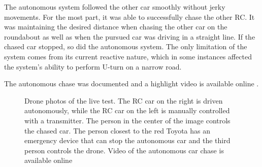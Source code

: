 \documentclass{ctuthesis/ctuthesis}
\begin{document}
The autonomous system followed the other car smoothly without jerky movements. For the most part, it was able to successfully chase the other RC. It was maintaining the desired distance when chasing the other car on the roundabout as well as when the pursued car was driving in a straight line. If the chased car stopped, so did the autonomous system. The only limitation of the system comes from its current reactive nature, which in some instances affected the system's ability to perform U-turn on a narrow road. \par

The autonomous chase was documented and a highlight video is available online \cite{my_yt_video}.

\begin{figure}[]
    \centering
    \quad
    \caption{Drone photos of the live test. The RC car on the right is driven autonomously, while the RC car on the left is manually controlled with a transmitter. The person in the center of the image controls the chased car. The person closest to the red Toyota has an emergency device that can stop the autonomous car and the third person controls the drone. Video of the autonomous car chase is available online \cite{my_yt_video}}\label{f:video}
\end{figure}
\end{document}
